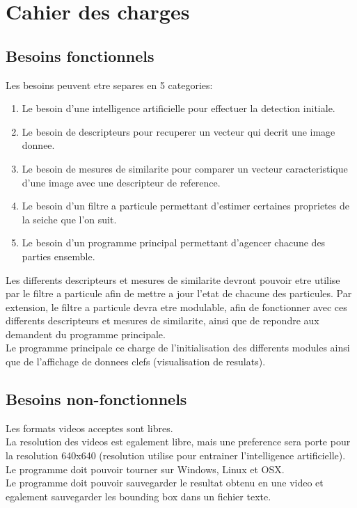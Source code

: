 \clearpage
\section{Cahier des charges}

\subsection{Besoins fonctionnels}
Les besoins peuvent etre separes en 5 categories:
\begin{enumerate}
	\item Le besoin d'une intelligence artificielle pour effectuer la detection initiale.
	\item Le besoin de descripteurs pour recuperer un vecteur qui decrit une image donnee.
	\item Le besoin de mesures de similarite pour comparer un vecteur caracteristique d'une image avec une descripteur de reference.
	\item Le besoin d'un filtre a particule permettant d'estimer certaines proprietes de la seiche que l'on suit.
	\item Le besoin d'un programme principal permettant d'agencer chacune des parties ensemble.\\
\end{enumerate}

Les differents descripteurs et mesures de similarite devront pouvoir etre utilise par le filtre a particule afin de mettre a jour l'etat de chacune des particules. Par extension, le filtre a particule devra etre modulable, afin de fonctionner avec ces differents descripteurs et mesures de similarite, ainsi que de repondre aux demandent du programme principale.\\
Le programme principale ce charge de l'initialisation des differents modules ainsi que de l'affichage de donnees clefs (visualisation de resulats).\\

\subsection{Besoins non-fonctionnels}
Les formats videos acceptes sont libres.\\
La resolution des videos est egalement libre, mais une preference sera porte pour la resolution 640x640 (resolution utilise pour entrainer l'intelligence artificielle).\\
Le programme doit pouvoir tourner sur Windows, Linux et OSX.\\
Le programme doit pouvoir sauvegarder le resultat obtenu en une video et egalement sauvegarder les bounding box dans un fichier texte.\\

